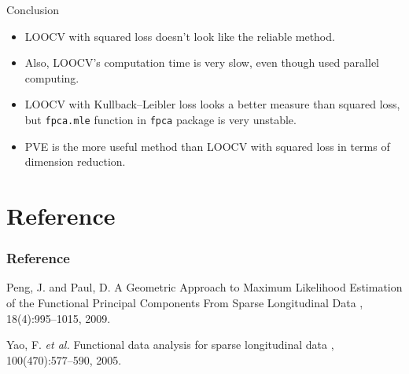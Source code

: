 \documentclass{beamer}
\begin{document}
\begin{frame}{Conclusion}
	\begin{itemize}
		\item {
			LOOCV with squared loss doesn't look like the reliable method.
		}	
		\item {
			Also, LOOCV's computation time is very slow, even though used parallel computing.
		}	
		\item {
			LOOCV with Kullback–Leibler loss looks a better measure than squared loss, but \texttt{fpca.mle} function in \texttt{fpca} package is very unstable.
		}
		\item {
			PVE is the more useful method than LOOCV with squared loss in terms of dimension reduction.
		}
	\end{itemize}
\end{frame}


\appendix
\section{Reference}
\begin{frame}
  \frametitle<presentation>{Reference}
    
  \begin{thebibliography}{10}
  	\beamertemplatearticlebibitems
  	Peng, J. and Paul, D.
  	\newblock A Geometric Approach to Maximum Likelihood Estimation of the Functional Principal Components From Sparse Longitudinal Data
  	, 18(4):995--1015,
  	2009.
		
   	\beamertemplatearticlebibitems
		Yao, F. \textit{et al.}
		\newblock Functional data analysis for sparse longitudinal data
		, 100(470):577--590,
		2005.
  \end{thebibliography}
\end{frame}


%
%    
%    
%
% 
%    
%
\end{document}

